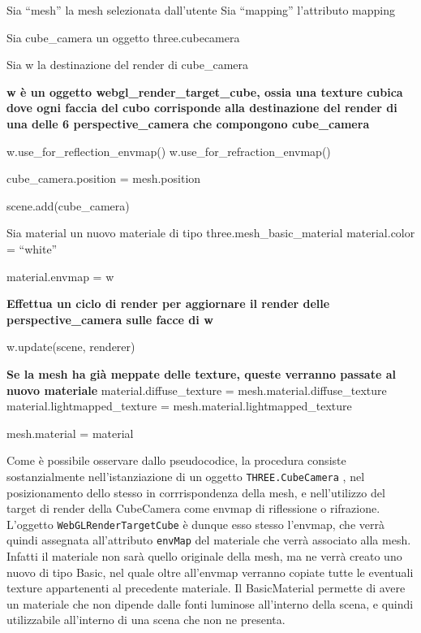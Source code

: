 \begin{algorithm}[H]
Sia “mesh” la mesh selezionata dall’utente\; 
Sia “mapping” l’attributo mapping\;

Sia cube\_camera un oggetto three.cubecamera\;

Sia w la destinazione del render di cube\_camera\;

\textbf{w è un oggetto webgl\_render\_target\_cube, ossia una texture cubica dove ogni faccia del cubo corrisponde alla destinazione del render di una delle 6 perspective\_camera che compongono cube\_camera}\;

 {
	w.use\_for\_reflection\_envmap()\;
}
 {
	w.use\_for\_refraction\_envmap()\;	
}

cube\_camera.position = mesh.position\;

scene.add(cube\_camera)\;

Sia material un nuovo materiale di tipo three.mesh\_basic\_material\;
material.color = “white”\;

material.envmap = w\;

\textbf{Effettua un ciclo di render per aggiornare il render delle perspective\_camera sulle facce di w}\;

w.update(scene, renderer)\;

\textbf{Se la mesh ha già meppate delle texture,
queste verranno passate al nuovo materiale}\;
material.diffuse\_texture = mesh.material.diffuse\_texture\;
material.lightmapped\_texture = mesh.material.lightmapped\_texture\;

mesh.material = material\;

\end{algorithm}
Come è possibile osservare dallo pseudocodice, la procedura consiste sostanzialmente nell’istanziazione di un oggetto \texttt{THREE.CubeCamera} , nel posizionamento dello stesso in corrrispondenza della mesh, e nell’utilizzo del target di render della CubeCamera come envmap di riflessione o rifrazione. L’oggetto \texttt{WebGLRenderTargetCube} è dunque esso stesso l’envmap, che verrà quindi assegnata all’attributo \texttt{envMap} del materiale che verrà associato alla mesh.
\\
Infatti il materiale non sarà quello originale della mesh, ma ne verrà creato uno nuovo di tipo Basic, nel quale oltre all’envmap verranno copiate tutte le eventuali texture appartenenti al precedente materiale. Il BasicMaterial permette di avere un materiale che non dipende dalle fonti luminose all’interno della scena, e quindi utilizzabile all’interno di una scena che non ne presenta.
